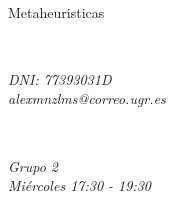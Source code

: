 \documentclass[12pt, spanish]{article}
\makeatletter
\let\theauthor\@author
\makeatother
\begin{document}
\begin{titlepage}
    \begin{minipage}{0.4\textwidth}
        \begin{flushleft} \large
            \theauthor
        \end{flushleft}
   \end{minipage}~
   \begin{minipage}{0.4\textwidth}
      \begin{flushright} \large
         Metaheuristicas
      \end{flushright}
   \end{minipage}\\[0.2 cm]
   \begin{minipage}{0.4\textwidth}
        \begin{flushleft} \large
        		\emph{DNI: 77393031D \\ alexmnzlms@correo.ugr.es}
        \end{flushleft}
   \end{minipage}~
   \begin{minipage}{0.4\textwidth}
      \begin{flushright} \large
         \emph{Grupo 2 \\ Miércoles 17:30 - 19:30}
      \end{flushright}
   \end{minipage}\\[1 cm]
   

    \vfill

\end{titlepage}

\pagebreak

\tableofcontents
\pagebreak
\end{document}
